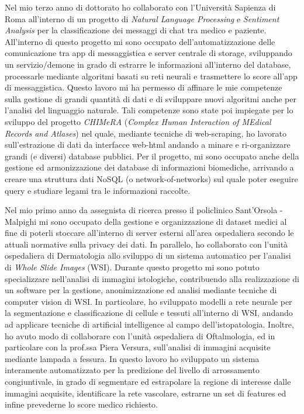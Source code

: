 \documentclass[a4paper,11pt]{article}
\begin{document}
Nel mio terzo anno di dottorato ho collaborato con l'Università Sapienza di Roma all'interno di un progetto di \emph{Natural Language Processing} e \emph{Sentiment Analysis} per la classificazione dei messaggi di chat tra medico e paziente.
All'interno di questo progetto mi sono occupato dell'automatizzazione delle comunicazione tra app di messaggistica e server centrale di storage, sviluppando un servizio/demone in grado di estrarre le informazioni all'interno del database, processarle mediante algoritmi basati su reti neurali e trasmettere lo score all'app di messaggistica.
Questo lavoro mi ha permesso di affinare le mie competenze sulla gestione di grandi quantità di dati e di sviluppare nuovi algoritmi anche per l'analisi del linguaggio naturale.
Tali competenze sono state poi impiegate per lo sviluppo del progetto \emph{CHIMeRA} (\emph{Complex Human Interaction of MEdical Records and Atlases}) nel quale, mediante tecniche di web-scraping, ho lavorato sull'estrazione di dati da interfacce web-html andando a minare e ri-organizzare grandi (e diversi) database pubblici.
Per il progetto, mi sono occupato anche della gestione ed armonizzazione dei database di informazioni biomediche, arrivando a creare una struttura dati NoSQL (o network-of-networks) sul quale poter eseguire query e studiare legami tra le informazioni raccolte.

Nel mio primo anno da assegnista di ricerca presso il policlinico Sant'Orsola - Malpighi mi sono occupato della gestione e organizzazione di dataset medici al fine di poterli stoccare all'interno di server esterni all'area ospedaliera secondo le attuali normative sulla privacy dei dati.
In parallelo, ho collaborato con l'unità ospedaliera di Dermatologia allo sviluppo di un sistema automatico per l'analisi di \emph{Whole Slide Images} (WSI).
Durante questo progetto mi sono potuto specializzare nell'analisi di immagini istologiche, contribuendo alla realizzazione di un software per la gestione, anonimizzazione ed analisi mediante tecniche di computer vision di WSI.
In particolare, ho sviluppato modelli a rete neurale per la segmentazione e classificazione di cellule e tessuti all'interno di WSI, andando ad applicare tecniche di artificial intelligence al campo dell'istopatologia.
Inoltre, ho avuto modo di collaborare con l'unità ospedaliera di Oftalmologia, ed in particolare con la prof.ssa Piera Versura, sull'analisi di immagini acquisite mediante lampada a fessura.
In questo lavoro ho sviluppato un sistema interamente automatizzato per la predizione del livello di arrossamento congiuntivale, in grado di segmentare ed estrapolare la regione di interesse dalle immagini acquisite, identificare la rete vascolare, estrarne un set di features ed infine prevederne lo score medico richiesto.
\end{document}
